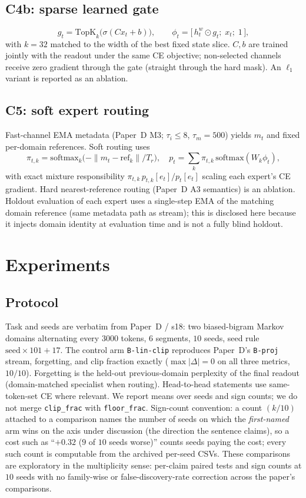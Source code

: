 \documentclass[preprint,12pt]{elsarticle}
\begin{document}
\subsection{C4b: sparse learned gate}
\begin{equation}
g_t=\mathrm{TopK}_k\big(\sigma(C x_t+b)\big),\qquad
\phi_t=\big[\,h^w_t\odot g_t;\; x_t;\; 1\,\big],
\end{equation}
with $k=32$ matched to the width of the best fixed state slice. $C,b$
are trained jointly with the readout under the same CE objective;
non-selected channels receive zero gradient through the gate (straight
through the hard mask). An $\ell_1$ variant is reported as an ablation.

\subsection{C5: soft expert routing}
Fast-channel EMA metadata (Paper~D M3; $\tau_i\le 8$, $\tau_m=500$)
yields $m_t$ and fixed per-domain references. Soft routing uses
\begin{equation}
\pi_{t,k}=\mathrm{softmax}_k\big(-\|m_t-\mathrm{ref}_k\|/T_r\big),\quad
p_t=\sum_k \pi_{t,k}\,\mathrm{softmax}(W_k\phi_t),
\end{equation}
with exact mixture responsibility
$\pi_{t,k}\,p_{t,k}[e_t]/p_t[e_t]$ scaling each expert's CE gradient.
Hard nearest-reference routing (Paper~D A3 semantics) is an ablation.
Holdout evaluation of each expert uses a single-step EMA of the
matching domain reference (same metadata path as stream); this is
disclosed here because it injects domain identity at evaluation time
and is not a fully blind holdout.

\section{Experiments}
\label{sec:exp}

\subsection{Protocol}
Task and seeds are verbatim from Paper~D / s18: two biased-bigram
Markov domains alternating every $3000$ tokens, $6$ segments, $10$
seeds, seed rule $\mathrm{seed}\times101+17$. The control arm
\texttt{B-lin-clip} reproduces Paper~D's \texttt{B-proj} stream,
forgetting, and clip fraction exactly ($\max|\Delta|=0$ on all three
metrics, $10/10$). Forgetting is the held-out previous-domain
perplexity of the final readout (domain-matched specialist when
routing). Head-to-head statements use same-token-set CE where
relevant. We report means over seeds and sign counts; we do not merge
\texttt{clip\_frac} with \texttt{floor\_frac}. Sign-count convention:
a count $(k/10)$ attached to a comparison names the number of seeds on
which the \emph{first-named} arm wins on the axis under discussion
(the direction the sentence claims), so a cost such as ``$+0.32$ ($9$
of $10$ seeds worse)'' counts seeds paying the cost; every such count is
computable from the archived per-seed CSVs. These comparisons are
exploratory in the multiplicity sense: per-claim paired tests and sign
counts at $10$ seeds with no family-wise or false-discovery-rate
correction across the paper's comparisons.
\end{document}
